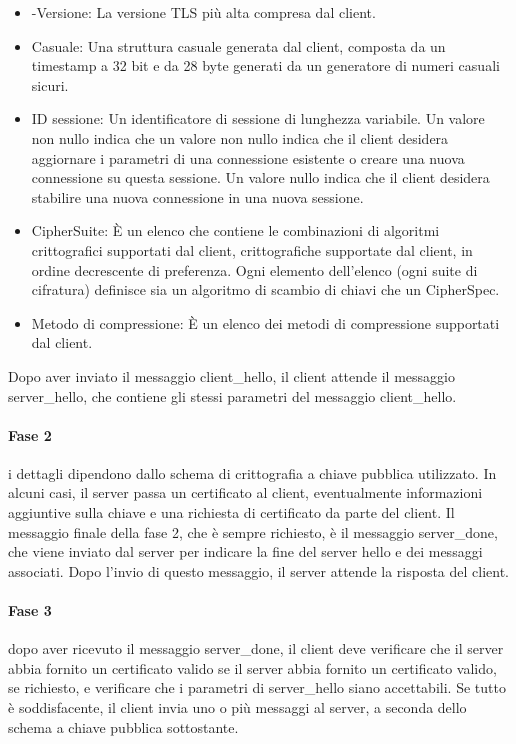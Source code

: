 \begin{itemize}
    \item -Versione: La versione TLS più alta compresa dal client.
    
    \item Casuale: Una struttura casuale generata dal client, composta da un timestamp a 32 bit e da 28 byte generati da un generatore di numeri casuali sicuri.
    
    \item ID sessione: Un identificatore di sessione di lunghezza variabile. Un valore non nullo indica che un valore non nullo indica che il client desidera aggiornare i parametri di una connessione esistente o creare una nuova connessione su questa sessione. Un valore nullo indica che il client desidera stabilire una nuova connessione in una nuova sessione.
    
    \item CipherSuite: È un elenco che contiene le combinazioni di algoritmi crittografici supportati dal client, crittografiche supportate dal client, in ordine decrescente di preferenza. Ogni elemento dell'elenco (ogni suite di cifratura) definisce sia un algoritmo di scambio di chiavi che un CipherSpec.
    
    \item Metodo di compressione: È un elenco dei metodi di compressione supportati dal client.
\end{itemize}
Dopo aver inviato il messaggio client\_hello, il client attende il messaggio server\_hello, che contiene gli stessi parametri del messaggio client\_hello.

\singlespacing

\paragraph{Fase 2} i dettagli dipendono dallo schema di crittografia a chiave pubblica utilizzato. In alcuni casi, il server passa un certificato al client, eventualmente informazioni aggiuntive sulla chiave e una richiesta di certificato da parte del client. Il messaggio finale della fase 2, che è sempre richiesto, è il messaggio server\_done, che viene inviato dal server per indicare la fine del server hello e dei messaggi associati. Dopo l'invio di questo messaggio, il server attende la risposta del client.

\singlespacing

\paragraph{Fase 3} dopo aver ricevuto il messaggio server\_done, il client deve verificare che il server abbia fornito un certificato valido se il server abbia fornito un certificato valido, se richiesto, e verificare che i parametri di server\_hello siano accettabili. Se tutto è soddisfacente, il client invia uno o più messaggi al server, a seconda dello schema a chiave pubblica sottostante.

